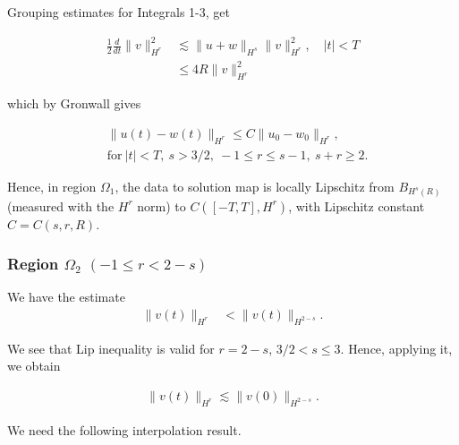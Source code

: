\documentclass{beamer}
\numberwithin{equation}{section}
\begin{document}
\begin{frame}
Grouping estimates for Integrals 1-3, get


\begin{equation*}
\begin{split}
\frac{1}{2} \frac{d}{dt}
\|v\|_{H^r}^2
& \lesssim \|u+w\|_{H^s}
\|v\|_{H^r}^2, \quad | t | < T
\\
& \le 4R \| v \|_{H^{r}}^{2}
\label{9v}
\end{split}
\end{equation*}

\pause
which by Gronwall gives

\begin{equation*}
  \label{lip-ineq}
\begin{split}
  & \| u(t) - w(t) \|_{H^{r}} \le C \| u_{0} - w_{0} \|_{H^{r}}, 
  \\
  & \text{for} \ | t | < T,
  \ s > 3/2, \ -1 \le r \le s-1, \ s + r \ge 2.
\end{split}
\end{equation*}

\pause

Hence, in region $\Omega_{1}$, the data to solution map is locally Lipschitz from
$B_{H^{s}(R)}$ (measured with the $H^{r}$
norm) to $C([-T, T], H^{r})$, with Lipschitz constant $C = C(s, r, R)$.

\end{frame}



\begin{frame}
\frametitle{Region $\Omega_{2}$ $(-1 \le r < 2-s)$} 

We have the estimate
\begin{equation*}
  \label{fgh}
\begin{split}
  \| v(t) \|_{H^{r}}
  & < \|v(t) \|_{H^{2-s}}.
    \end{split}
\end{equation*}

\end{frame}
\begin{frame}
We see that Lip inequality is valid for $r = 2-s$, $3/2 < s \le 3$.
Hence, applying it, we obtain 




\begin{equation*}
\begin{split}
\| v(t) \|_{H^{r}}
 \lesssim \|v(0) \|_{H^{2-s}}.
\end{split}
\end{equation*}





We need the following interpolation
result. 
 \end{frame} 
\end{document}
